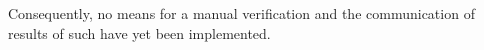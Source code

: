 Consequently, no means for a manual verification and the communication
of results of such have yet been implemented.









%
%

